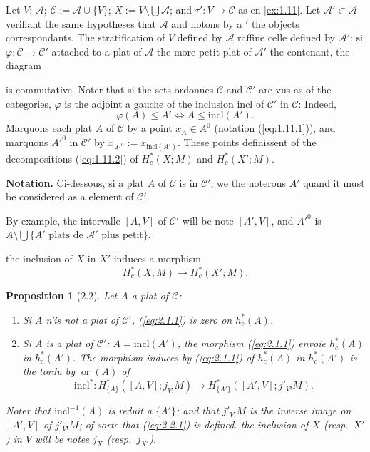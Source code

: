 \documentclass[11pt,a4paper]{article}
\theoremstyle{plain}
\newtheorem{proposition}[theorem]{Proposition}
\theoremstyle{definition}
\newcommand{\ori}{\operatorname{or}}
\begin{document}
Let $V$; $\mathcal{A}$; $\mathcal{C} := \mathcal{A} \cup \{V\}$; $X := V \setminus \bigcup\mathcal{A}$; and $\tau': V \to \mathcal{C}$ as en \ref{ex:1.11}. Let $\mathcal{A}' \subset \mathcal{A}$ verifiant the same hypotheses that $\mathcal{A}$ and notons by a $'$ the objects correspondants. The stratification of $V$ defined by $\mathcal{A}$ raffine celle defined by $\mathcal{A}'$: si $\varphi: \mathcal{C} \to \mathcal{C}'$ attached to a plat of $\mathcal{A}$ the more petit plat of $\mathcal{A}'$ the contenant, the diagram
is commutative. Noter that si the sets ordonnes $\mathcal{C}$ and $\mathcal{C}'$ are vus as of the categories, $\varphi$ is the adjoint a gauche of the inclusion $\mathrm{incl}$ of $\mathcal{C}'$ in $\mathcal{C}$: Indeed,
\[\varphi(A) \leq A' \iff A \leq \mathrm{incl}(A').\]
Marquons each plat $A$ of $\mathcal{C}$ by a point $x_A \in A^0$ (notation (\ref{eq:1.11.1})), and marquons $A'^0$ in $\mathcal{C}'$ by $x_{A'^0} := x_{\mathrm{incl}(A')}$. These points definissent of the decompositions (\ref{eq:1.11.2}) of $H^*_c(X;M)$ and $H^*_c(X';M)$.

\textbf{Notation.} Ci-dessous, si a plat $A$ of $\mathcal{C}$ is in $\mathcal{C}'$, we the noterons $A'$ quand it must be considered as a element of $\mathcal{C}'$.

By example, the intervalle $[A,V]$ of $\mathcal{C}'$ will be note $[A',V]$, and $A'^0$ is $A \setminus \bigcup\{A' \text{ plats de } \mathcal{A}' \text{ plus petit}\}$.

the inclusion of $X$ in $X'$ induces a morphism
\begin{equation}\label{eq:2.1.1}
H^*_c(X;M) \longrightarrow H^*_c(X';M).
\tag{2.1.1}
\end{equation}

\begin{proposition}[2.2]\label{prop:2.2}
Let $A$ a plat of $\mathcal{C}$:
\begin{enumerate}[label=(\roman*)]
\item Si $A$ n'is not a plat of $\mathcal{C}'$, (\ref{eq:2.1.1}) is zero on $h^*_c(A)$.
\item Si $A$ is a plat of $\mathcal{C}'$: $A = \mathrm{incl}(A')$, the morphism (\ref{eq:2.1.1}) envoie $h^*_c(A)$ in $h^*_c(A')$. The morphism induces by (\ref{eq:2.1.1}) of $h^*_c(A)$ in $h^*_c(A')$ is the tordu by $\ori(A)$ of
\begin{equation}\label{eq:2.2.1}
\mathrm{incl}^*: H^*_{\{A\}}([A,V];j_{V!}M) \longrightarrow H^*_{\{A'\}}([A',V];j'_{V!}M).
\tag{2.2.1}
\end{equation}
\end{enumerate}
Noter that $\mathrm{incl}^{-1}(A)$ is reduit a $\{A'\}$; and that $j'_{V!}M$ is the inverse image on $[A',V]$ of $j'_{V!}M$; of sorte that (\ref{eq:2.2.1}) is defined. the inclusion of $X$ (resp.~$X'$) in $V$ will be notee $j_X$ (resp.~$j_{X'}$).
\end{proposition}
\end{document}
